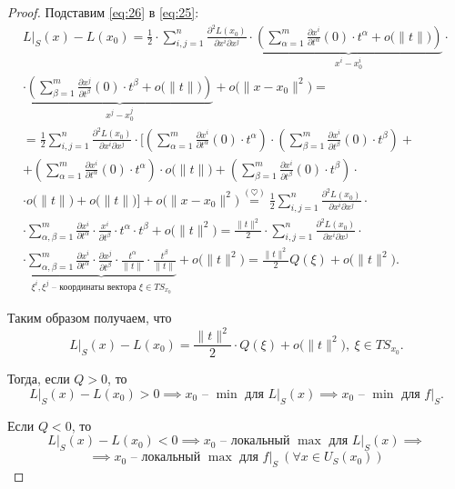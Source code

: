 \begin{proof}
    Подставим \ref{eq:26} в \ref{eq:25}:
    \begin{multline*}
        L\big|_S(x) - L(x_0) = \frac{1}{2}\cdot\sum_{i,j=1}^{n}\frac{\partial^2L(x_0)}{\partial x^i \partial x^j} \cdot \underbrace{\left(\sum_{\alpha=1}^{m}\frac{\partial x^i}{\partial t^\alpha}(0)\cdot t^\alpha + o\big(\|t\|\big)\right)}_{x^i - x_0^i}\cdot \\
        \cdot \underbrace{\left(\sum_{\beta=1}^{m}\frac{\partial x^j}{\partial t^\beta}(0)\cdot t^\beta + o\big(\|t\|\big)\right)}_{x^j - x_0^j} + o\big(\|x-x_0\|^2\big) = \\
        = \frac{1}{2}\sum_{i,j=1}^{n}\frac{\partial^2 L(x_0)}{\partial x^i \partial x^j}\cdot\Bigg[\left(\sum_{\alpha=1}^{m}\frac{\partial x^i}{\partial t^\alpha}(0)\cdot t^\alpha\right)\cdot\left(\sum_{\beta=1}^{m}\frac{\partial x^i}{\partial t^\beta}(0)\cdot t^\beta\right) + \\
            + \left(\sum_{\alpha=1}^{m}\frac{\partial x^i}{\partial t^\alpha}(0)\cdot t^\alpha\right)\cdot o\big(\|t\|\big) + \left(\sum_{\beta=1}^{m}\frac{\partial x^i}{\partial t^\beta}(0)\cdot t^\beta\right)\cdot \\
            \cdot o\big(\|t\|\big) + o\big(\|t\|\big)\Bigg] + o\big(\|x-x_0\|^2\big) \overset{(\heartsuit)}{=} \frac{1}{2}\sum_{i,j=1}^{n}\frac{\partial^2 L(x_0)}{\partial x^i \partial x^j} \cdot \\
        \cdot \sum_{\alpha,\beta = 1}^{m}\frac{\partial x^i}{\partial t^\alpha} \cdot \frac{x^i}{\partial t^\beta} \cdot t^\alpha \cdot t^\beta + o\big(\|t\|^2\big) = \frac{\|t\|^2}{2} \cdot \sum_{i,j=1}^{n}\frac{\partial^2 L(x_0)}{\partial x^i\partial x^j} \cdot \\
        \cdot \underbrace{\sum_{\alpha,\beta=1}^{m}\frac{\partial x^i}{\partial t^\alpha}\cdot \frac{\partial x^j}{\partial t^\beta} \cdot \frac{t^\alpha}{\|t\|} \cdot \frac{t^\beta}{\|t\|}}_{\xi^i,\xi^j\text{ -- координаты вектора }\xi\in TS_{x_0}} + o\big(\|t\|^2\big) = \frac{\|t\|^2}{2}Q(\xi) + o\big(\|t\|^2\big).
    \end{multline*}

    Таким образом получаем, что
    \[
        L\big|_S(x) - L(x_0) = \frac{\|t\|^2}{2} \cdot Q(\xi) + o\big(\|t\|^2\big), \ \xi \in TS_{x_0}.
    \]

    Тогда, если $Q> 0$, то
    \[
        L\big|_S(x) - L(x_0)> 0 \implies x_0 \text{ -- } \min \text{ для } L\big|_S(x) \implies x_0 \text{ -- } \min \text{ для } f\big|_S.
    \]

    Если $Q < 0$, то
    \[
        L\big|_S(x) - L(x_0) < 0 \implies x_0 \text{ -- локальный } \max \text{ для } L\big|_S(x) \implies
    \]
    \[
        \implies x_0 \text{ -- локальный } \max \text{ для } f\big|_S \ (\forall x \in U_S(x_0))
    \]


\end{proof}
